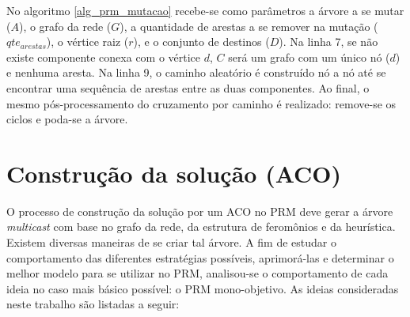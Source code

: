 No algoritmo \ref{alg_prm_mutacao} recebe-se como parâmetros a árvore a se mutar ($A$), o grafo da rede ($G$), a quantidade de arestas a se remover na mutação ($qte_{arestas}$), o vértice raiz ($r$), e o conjunto de destinos ($D$). Na linha 7, se não existe componente conexa com o vértice $d$, $C$ será um grafo com um único nó ($d$) e nenhuma aresta. Na linha 9, o caminho aleatório é construído nó a nó até se encontrar uma sequência de arestas entre as duas componentes. Ao final, o mesmo pós-processamento do cruzamento por caminho é realizado: remove-se os ciclos e poda-se a árvore.

\section{Construção da solução (ACO)}
\label{section_estrategias_prm_aco}

O processo de construção da solução por um ACO no PRM deve gerar a árvore \textit{multicast} com base no grafo da rede, da estrutura de feromônios e da heurística. Existem diversas maneiras de se criar tal árvore. A fim de estudar o comportamento das diferentes estratégias possíveis, aprimorá-las e determinar o melhor modelo para se utilizar no PRM, analisou-se o comportamento de cada ideia no caso mais básico possível: o PRM mono-objetivo. As ideias consideradas neste trabalho são listadas a seguir:

